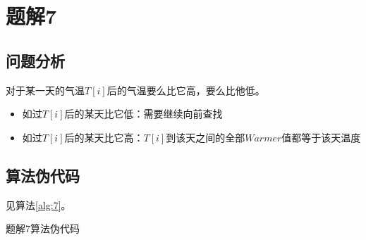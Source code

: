 \section{题解7}
\subsection{问题分析}
对于某一天的气温$T[i]$后的气温要么比它高，要么比他低。
\begin{itemize}
    \item 如过$T[i]$后的某天比它低：需要继续向前查找
    \item 如过$T[i]$后的某天比它高：$T[i]$到该天之间的全部$Warmer$值都等于该天温度
\end{itemize}

\subsection{算法伪代码}
见算法\ref{alg:7}。
\begin{algorithm}[htbp]
    \caption{题解7算法伪代码}\label{alg:7}
\end{algorithm}